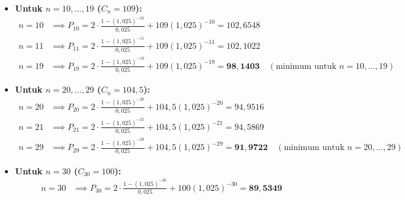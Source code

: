 \documentclass[10.5pt,a4paper]{article}
\begin{document}
\begin{itemize}
    \item \textbf{Untuk $n = 10, \dots, 19$ ($C_n = 109$):}
    \begin{align*}
        n = 10 &\implies P_{10} = 2 \cdot \frac{1 - (1{,}025)^{-10}}{0{,}025} + 109(1{,}025)^{-10} = 102{,}6548 \\
        n = 11 &\implies P_{11} = 2 \cdot \frac{1 - (1{,}025)^{-11}}{0{,}025} + 109(1{,}025)^{-11} = 102{,}1022 \\
        n = 19 &\implies P_{19} = 2 \cdot \frac{1 - (1{,}025)^{-19}}{0{,}025} + 109(1{,}025)^{-19} = \mathbf{98{,}1403} \quad (\text{minimum untuk } n = 10,\dots,19)
    \end{align*}

    \item \textbf{Untuk $n = 20, \dots, 29$ ($C_n = 104{,}5$):}
    \begin{align*}
        n = 20 &\implies P_{20} = 2 \cdot \frac{1 - (1{,}025)^{-20}}{0{,}025} + 104{,}5(1{,}025)^{-20} = 94{,}9516 \\
        n = 21 &\implies P_{21} = 2 \cdot \frac{1 - (1{,}025)^{-21}}{0{,}025} + 104{,}5(1{,}025)^{-21} = 94{,}5869 \\
        n = 29 &\implies P_{29} = 2 \cdot \frac{1 - (1{,}025)^{-29}}{0{,}025} + 104{,}5(1{,}025)^{-29} = \mathbf{91{,}9722} \quad (\text{minimum untuk } n = 20,\dots,29)
    \end{align*}

    \item \textbf{Untuk $n = 30$ ($C_{30} = 100$):}
    \begin{align*}
        n = 30 &\implies P_{30} = 2 \cdot \frac{1 - (1{,}025)^{-30}}{0{,}025} + 100(1{,}025)^{-30} = \mathbf{89{,}5349}
    \end{align*}
\end{itemize}
\end{document}
